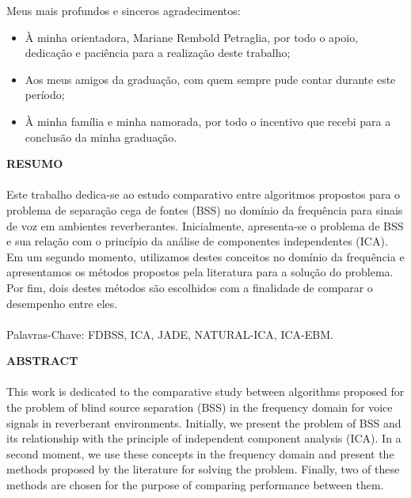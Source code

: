 Meus mais profundos e sinceros agradecimentos:
\begin{itemize}
    \item À minha orientadora, Mariane Rembold Petraglia, por todo o apoio, dedicação e paciência para a realização deste trabalho;
    \item Aos meus amigos da graduação, com quem sempre pude contar durante este período;
    \item À minha família e minha namorada, por todo o incentivo que recebi para a conclusão da minha graduação.
\end{itemize}

\pagebreak


\begin{center}
\textbf{RESUMO}
\end{center}
      \vspace{0.5cm}

\paragraph{}
Este trabalho dedica-se ao estudo comparativo entre algoritmos propostos para o problema de separação cega de fontes (BSS) no domínio da frequência para sinais de voz em ambientes reverberantes. Inicialmente, apresenta-se o problema de BSS e sua relação com o princípio da análise de componentes independentes (ICA). Em um segundo momento, utilizamos destes conceitos no domínio da frequência e apresentamos os métodos propostos pela literatura para a solução do problema. Por fim, dois destes métodos são escolhidos com a finalidade de comparar o desempenho entre eles.

\paragraph{}
\noindent Palavras-Chave: FDBSS, ICA, JADE, NATURAL-ICA, ICA-EBM.

\pagebreak


\begin{center}
\textbf{ABSTRACT}
\end{center}
      \vspace{0.5cm}

\paragraph{}

This work is dedicated to the comparative study between algorithms proposed for the problem of blind source separation (BSS) in the frequency domain for voice signals in reverberant environments. Initially, we present the problem of BSS and its relationship with the principle of independent component analysis (ICA). In a second moment, we use these concepts in the frequency domain and present the methods proposed by the literature for solving the problem. Finally, two of these methods are chosen for the purpose of comparing performance between them.

